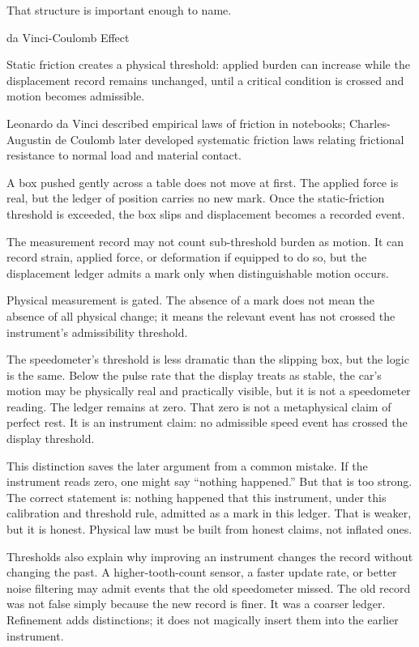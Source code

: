That structure is important enough to name.

\begin{phenom}{da Vinci-Coulomb Effect}
\label{ph:davinci-coulomb-effect}

\PhStatement Static friction creates a physical threshold: applied burden can
increase while the displacement record remains unchanged, until a critical
condition is crossed and motion becomes admissible.

\PhOrigin Leonardo da Vinci described empirical laws of friction in notebooks;
Charles-Augustin de Coulomb later developed systematic friction laws relating
frictional resistance to normal load and material contact.

\PhObservation A box pushed gently across a table does not move at first. The
applied force is real, but the ledger of position carries no new mark. Once the
static-friction threshold is exceeded, the box slips and displacement becomes a
recorded event.

\PhConstraint The measurement record may not count sub-threshold burden as
motion. It can record strain, applied force, or deformation if equipped to do
so, but the displacement ledger admits a mark only when distinguishable motion
occurs.

\PhConsequence Physical measurement is gated. The absence of a mark does not
mean the absence of all physical change; it means the relevant event has not
crossed the instrument's admissibility threshold.

\end{phenom}

The speedometer's threshold is less dramatic than the slipping box, but the
logic is the same. Below the pulse rate that the display treats as stable, the
car's motion may be physically real and practically visible, but it is not a
speedometer reading. The ledger remains at zero. That zero is not a metaphysical
claim of perfect rest. It is an instrument claim: no admissible speed event has
crossed the display threshold.

This distinction saves the later argument from a common mistake. If the
instrument reads zero, one might say ``nothing happened.'' But that is too
strong. The correct statement is: nothing happened that this instrument, under
this calibration and threshold rule, admitted as a mark in this ledger. That is
weaker, but it is honest. Physical law must be built from honest claims, not
inflated ones.

Thresholds also explain why improving an instrument changes the record without
changing the past. A higher-tooth-count sensor, a faster update rate, or better
noise filtering may admit events that the old speedometer missed. The old
record was not false simply because the new record is finer. It was a coarser
ledger. Refinement adds distinctions; it does not magically insert them into
the earlier instrument.


